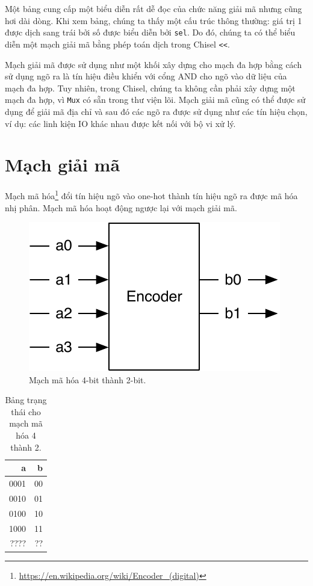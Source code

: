 \documentclass[%
    10pt,
    headinclude, footexclude,
    openright, %
    notitlepage,
    cleardoubleempty,
    headsepline,
    pointlessnumbers,
    bibtotoc, idxtotoc,
    ]{scrbook}
\newcommand{\code}[1]{{\small{\texttt{#1}}}}
\newcommand{\scale}{0.7}
\newcommand{\myref}[2]{\href{#1}{#2}}
\renewcommand{\myref}[2]{{#2}{\footnote{\url{#1}}}}
\begin{document}
Một bảng cung cấp một biểu diễn rất dễ đọc của chức năng giải mã nhưng cũng hơi dài dòng.
Khi xem bảng, chúng ta thấy một cấu trúc thông thường: giá trị 1 được dịch sang trái bởi số được 
biểu diễn bởi \code{sel}. Do đó, chúng ta có thể biểu diễn một mạch giải mã bằng phép toán dịch trong Chisel \code{<<}.


Mạch giải mã được sử dụng như một khối xây dựng cho mạch đa hợp bằng cách sử dụng ngõ ra 
là tín hiệu điều khiển với cổng AND cho ngõ vào dữ liệu của mạch đa hợp. Tuy nhiên, trong Chisel, 
chúng ta không cần phải xây dựng một mạch đa hợp, vì \code{Mux} có sẵn trong thư viện lõi.
Mạch giải mã cũng có thể được sử dụng để giải mã địa chỉ và sau đó các ngõ ra được sử dụng 
như các tín hiệu chọn, ví dụ: các linh kiện IO khác nhau được kết nối với bộ vi xử lý.

\section{Mạch giải mã}

\myref{https://en.wikipedia.org/wiki/Encoder_(digital)}{Mạch mã hóa}
đổi tín hiệu ngõ vào one-hot thành tín hiệu ngõ ra được mã hóa nhị phân.
Mạch mã hóa hoạt động ngược lại với mạch giải mã.

\begin{figure}
  \centering
  \includegraphics[scale=\scale]{figures/encoder}
  \caption{Mạch mã hóa 4-bit thành 2-bit.}
  \label{fig:encoder}
\end{figure}


\begin{table}
 \centering
 \label{tab:encoder}
  \begin{tabular}{rr}
    \toprule
    a & b \\
    \midrule
    0001 & 00 \\
    0010 & 01 \\
    0100 & 10 \\
    1000 & 11 \\
    ???? & ?? \\
    \bottomrule 
  \end{tabular} 
  \caption{Bảng trạng thái cho mạch mã hóa 4 thành 2.}
\end{table}
\end{document}
